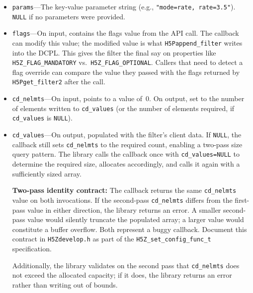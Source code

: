 \documentclass[../RFC-HDFG-2026-001.tex]{subfiles}
\begin{document}
\begin{itemize}
\item \texttt{params}---The key-value parameter string (e.g.,
  \texttt{"mode=\textquotedbl{}rate\textquotedbl{}, rate=3.5"}). \texttt{NULL} if no parameters were provided.
\item \texttt{flags}---On input, contains the flags value from the API call. The
  callback can modify this value; the modified value is what
  \texttt{H5Pappend\_filter} writes into the DCPL. This gives the filter the
  final say on properties like \texttt{H5Z\_FLAG\_MANDATORY} vs.\
  \texttt{H5Z\_FLAG\_OPTIONAL}. Callers that need to detect a flag override can
  compare the value they passed with the flags returned by
  \texttt{H5Pget\_filter2} after the call.
\item \texttt{cd\_nelmts}---On input, points to a value of~0. On output, set to the
  number of elements written to \texttt{cd\_values} (or the number of elements
  required, if \texttt{cd\_values} is \texttt{NULL}).
\item \texttt{cd\_values}---On output, populated with the filter's client data. If
  \texttt{NULL}, the callback still sets \texttt{cd\_nelmts} to the required count,
  enabling a two-pass size query pattern. The library calls the callback once
  with \texttt{cd\_values=NULL} to determine the required size, allocates
  accordingly, and calls it again with a sufficiently sized array.

  \textbf{Two-pass identity contract:} The callback returns the same
  \texttt{cd\_nelmts} value on both invocations. If the second-pass \texttt{cd\_nelmts}
  differs from the first-pass value in either direction, the library
  returns an error. A smaller second-pass value would silently truncate the
  populated array; a larger value would constitute a buffer overflow. Both
  represent a buggy callback. Document this contract in
  \texttt{H5Zdevelop.h} as part of the \texttt{H5Z\_set\_config\_func\_t} specification.

  Additionally, the library validates on the second pass that
  \texttt{cd\_nelmts} does not exceed the allocated capacity; if it does, the
  library returns an error rather than writing out of bounds.


\end{itemize}
\end{document}
